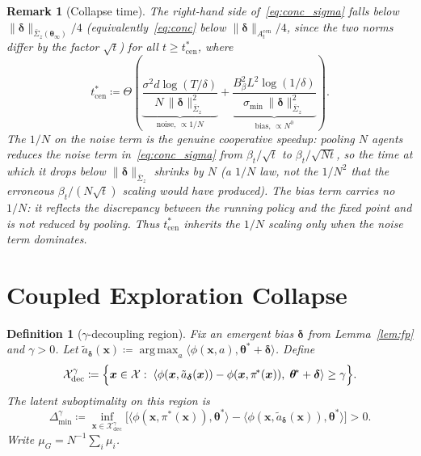 \documentclass[11pt]{article}
\newtheorem{definition}[theorem]{Definition}
\newtheorem*{remark}{Remark}
\DeclareMathOperator*{\argmax}{arg\,max}
\begin{document}
\begin{remark}[Collapse time]\label{rem:tstar}
The right-hand side of~\eqref{eq:conc_sigma} falls below
$\|\bm{\delta}\|_{\bar{\Sigma}_z(\bm{\theta}_\infty)}/4$
(equivalently~\eqref{eq:conc} below
$\|\bm{\delta}\|_{A_t^{\mathrm{cen}}}/4$, since the two norms differ by
the factor $\sqrt t$) for all $t\geq t_{\mathrm{cen}}^*$, where
\begin{equation}
t_{\mathrm{cen}}^*\coloneqq\Theta\!\left(
\underbrace{\frac{\sigma^2 d\log(T/\delta)}{N\,\|\bm{\delta}\|_{\bar{\Sigma}_z}^2}}_{\text{noise, }\propto 1/N}
+\underbrace{\frac{B_\beta^2 L^2\log(1/\delta)}{\sigma_{\min}\,\|\bm{\delta}\|_{\bar{\Sigma}_z}^2}}_{\text{bias, }\propto N^0}
\right).
\label{eq:tcen_def}
\end{equation}
The $1/N$ on the \emph{noise} term is the genuine cooperative speedup:
pooling $N$ agents reduces the noise term in~\eqref{eq:conc_sigma} from
$\beta_t/\sqrt t$ to $\beta_t/\sqrt{Nt}$, so the time at which it drops
below $\|\bm{\delta}\|_{\bar{\Sigma}_z}$ shrinks by $N$ (a $1/N$ law,
not the $1/N^2$ that the erroneous $\beta_t/(N\sqrt t)$ scaling would
have produced).  The \emph{bias} term carries no $1/N$: it reflects the
discrepancy between the running policy and the fixed point and is not
reduced by pooling.  Thus $t_{\mathrm{cen}}^*$ inherits the
$1/N$ scaling only when the noise term dominates.
\end{remark}


\section{Coupled Exploration Collapse}\label{sec:cec}

\begin{definition}[$\gamma$-decoupling region]\label{def:dec}
Fix an emergent bias $\bm{\delta}$ from Lemma~\ref{lem:fp}
and $\gamma>0$.
Let $\tilde{a}_{\bm{\delta}}(\bm{x})\coloneqq
\argmax_a\langle\phi(\bm{x},a),\bm{\theta}^{\!*}+\bm{\delta}\rangle$.
Define
\[
\mathcal{X}_{\mathrm{dec}}^\gamma\coloneqq\Bigl\{\bm{x}\in\mathcal{X}:\;
\langle\phi(\bm{x},\tilde{a}_{\bm{\delta}}(\bm{x}))
-\phi(\bm{x},\pi^{\!*}(\bm{x})),\;\bm{\theta}^{\!*}+\bm{\delta}\rangle\geq\gamma
\Bigr\}.
\]
The \emph{latent suboptimality} on this region is
\[
\Delta_{\min}^\gamma\coloneqq
\inf_{\bm{x}\in\mathcal{X}_{\mathrm{dec}}^\gamma}
\bigl[\langle\phi(\bm{x},\pi^{\!*}(\bm{x})),\bm{\theta}^{\!*}\rangle
-\langle\phi(\bm{x},\tilde{a}_{\bm{\delta}}(\bm{x})),\bm{\theta}^{\!*}\rangle\bigr]>0.
\]
Write $\mu_G=N^{-1}\sum_i\mu_i$.
\end{definition}
\end{document}
